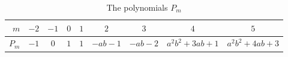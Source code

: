 \documentclass[10pt,a4paper]{amsart}
\theoremstyle{definition}
\begin{document}
\begin{table}[ht]
\renewcommand{\arraystretch}{1.2}
\begin{tabular}{|r|||c|c|c|c|c|c|c|c|}
\hline
$m$&$-2$&$-1$&$0$&$1$&$2$&$3$&$4$&$5$\\\hline\hline
$P_m$&	$-1$	&$0$	&$1$	&$1$	&$-ab-1$&$-ab-2$&$a^2b^2+3ab+1$	&$a^2b^2+4ab+3$	\\\hline
\end{tabular}\\[3pt]
\caption{The polynomials $P_m$}
\label{pm table}
\end{table}
\end{document}
